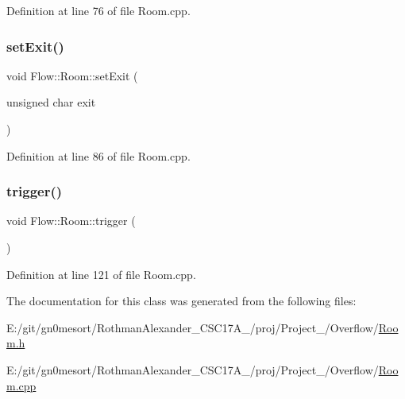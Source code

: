 Definition at line 76 of file Room.\+cpp.

\hypertarget{class_flow_1_1_room_a7e51216a03e8acec7535098bee3edcb9}{}\label{class_flow_1_1_room_a7e51216a03e8acec7535098bee3edcb9} 
\subsubsection{\texorpdfstring{set\+Exit()}{setExit()}}
{\footnotesize\ttfamily void Flow\+::\+Room\+::set\+Exit (\begin{DoxyParamCaption}\item[{unsigned char}]{exit }\end{DoxyParamCaption})}



Definition at line 86 of file Room.\+cpp.

\hypertarget{class_flow_1_1_room_a83ff2a5cb0b32dace3839cbbca2cfc33}{}\label{class_flow_1_1_room_a83ff2a5cb0b32dace3839cbbca2cfc33} 
\subsubsection{\texorpdfstring{trigger()}{trigger()}}
{\footnotesize\ttfamily void Flow\+::\+Room\+::trigger (\begin{DoxyParamCaption}{ }\end{DoxyParamCaption})}



Definition at line 121 of file Room.\+cpp.



The documentation for this class was generated from the following files\+:\begin{DoxyCompactItemize}
\item 
E\+:/git/gn0mesort/\+Rothman\+Alexander\+\_\+\+C\+S\+C17\+A\+\_/proj/\+Project\+\_/\+Overflow/\hyperlink{_room_8h}{Room.\+h}\item 
E\+:/git/gn0mesort/\+Rothman\+Alexander\+\_\+\+C\+S\+C17\+A\+\_/proj/\+Project\+\_/\+Overflow/\hyperlink{_room_8cpp}{Room.\+cpp}\end{DoxyCompactItemize}
